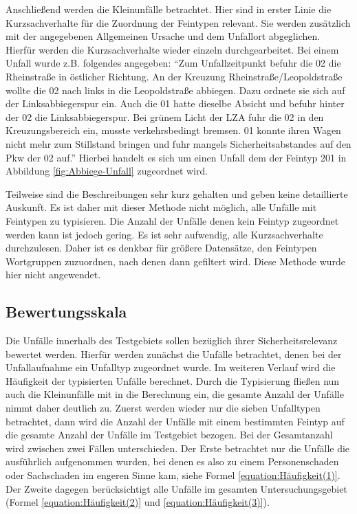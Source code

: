 Anschließend werden die Kleinunfälle betrachtet. Hier sind in erster Linie die Kurzsachverhalte für die Zuordnung der Feintypen relevant. Sie werden zusätzlich mit der angegebenen Allgemeinen Ursache und dem Unfallort abgeglichen. Hierfür werden die Kurzsachverhalte wieder einzeln durchgearbeitet. Bei einem Unfall wurde z.B. folgendes angegeben: \enquote{Zum Unfallzeitpunkt befuhr die 02 die Rheinstraße in östlicher Richtung. An der Kreuzung Rheinstraße/Leopoldstraße wollte die 02 nach links in die Leopoldstraße abbiegen. Dazu ordnete sie sich auf der Linksabbiegerspur ein. Auch die 01 hatte dieselbe Absicht und befuhr hinter der 02 die Linksabbiegerspur. Bei grünem Licht der LZA fuhr die 02 in den Kreuzungsbereich ein, musste verkehrsbedingt bremsen. 01 konnte ihren Wagen nicht mehr zum Stillstand bringen und fuhr mangels Sicherheitsabstandes auf den Pkw der 02 auf.} Hierbei handelt es sich um einen Unfall dem der Feintyp 201 in Abbildung \ref{fig:Abbiege-Unfall} zugeordnet wird.

Teilweise sind die Beschreibungen sehr kurz gehalten und geben keine detaillierte Auskunft. Es ist daher mit dieser Methode nicht möglich, alle Unfälle mit Feintypen zu typisieren. Die Anzahl der Unfälle denen kein Feintyp zugeordnet werden kann ist jedoch gering. Es ist sehr aufwendig, alle Kurzsachverhalte durchzulesen. Daher ist es denkbar für größere Datensätze, den Feintypen Wortgruppen zuzuordnen, nach denen dann gefiltert wird. Diese Methode wurde hier nicht angewendet. %

\subsection{Bewertungsskala}\label{subsection:Bewertungsskala}
Die Unfälle innerhalb des Testgebiets sollen bezüglich ihrer Sicherheitsrelevanz bewertet werden. Hierfür werden zunächst die Unfälle betrachtet, denen bei der Unfallaufnahme ein Unfalltyp zugeordnet wurde. Im weiteren Verlauf wird die Häufigkeit der typisierten Unfälle berechnet. Durch die Typisierung fließen nun auch die Kleinunfälle mit in die Berechnung ein, die gesamte Anzahl der Unfälle nimmt daher deutlich zu. Zuerst werden wieder nur die sieben Unfalltypen betrachtet, dann wird die Anzahl der Unfälle mit einem bestimmten Feintyp auf die gesamte Anzahl der Unfälle im Testgebiet bezogen. Bei der Gesamtanzahl wird zwischen zwei Fällen unterschieden. Der Erste betrachtet nur die Unfälle die ausführlich aufgenommen wurden, bei denen es also zu einem Personenschaden oder Sachschaden im engeren Sinne kam, siehe Formel \ref{equation:Häufigkeit(1)}. Der Zweite dagegen berücksichtigt alle Unfälle im gesamten Untersuchungsgebiet (Formel \ref{equation:Häufigkeit(2)} und \ref{equation:Häufigkeit(3)}).

